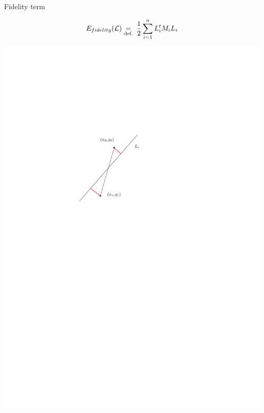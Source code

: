 \begin{frame}[t]{Fidelity term}
\begin{minipage}{0.6\linewidth}
	\[
		E_{fidelity}(\mathcal{L}) \underset{\text{def.}}{=} \: \frac{1}{2} \sum_{i = 1}^{n} L_i^t M_i L_i
	\]
	\end{minipage}%
	\hfill
	\begin{minipage}{0.3\linewidth}
		\includegraphics[width=\linewidth]{metric_definition}
	\end{minipage}
\end{frame}

